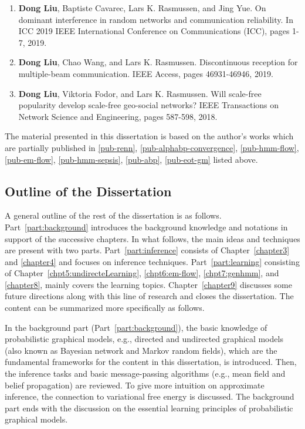 \begin{enumerate}
\item \textbf{Dong Liu}, Baptiste Cavarec, Lars K. Rasmussen, and Jing Yue. On dominant interference in random networks and communication reliability. In ICC 2019 IEEE International Conference on Communications (ICC), pages 1-7, 2019.
  
\item \textbf{Dong Liu}, Chao Wang, and Lars K. Rasmussen. Discontinuous reception for multiple-beam communication. IEEE Access, pages 46931-46946, 2019.
  
\item \textbf{Dong Liu}, Viktoria Fodor, and Lars K. Rasmussen. Will scale-free popularity develop scale-free geo-social networks? IEEE Transactions on Network Science and Engineering, pages 587-598, 2018.
\end{enumerate}


The material presented in this dissertation is based on the author's works which are partially published in \ref{pub-renn}, \ref{pub-alphabp-convergence}, \ref{pub-hmm-flow}, \ref{pub-em-flow}, \ref{pub-hmm-sepsis}, \ref{pub-abp}, \ref{pub-eot-gm} listed above.
\subsection{Outline of the Dissertation}

A general outline of the rest of the dissertation is as follows. Part~\ref{part:background} introduces the background knowledge and notations in support of the successive chapters. In what follows, the main ideas and techniques are present with two parts. Part~\ref{part:inference} consists of Chapter~\ref{chapter3} and \ref{chapter4} and focuses on inference techniques. Part~\ref{part:learning} consisting of Chapter~\ref{chpt5:undirecteLearning}, \ref{chpt6:em-flow}, \ref{chpt7:genhmm}, and \ref{chapter8}, mainly covers the learning topics. Chapter~\ref{chapter9} discusses some future directions along with this line of research and closes the dissertation. The content can be summarized more specifically as follows.

In the background part (Part~\ref{part:background}), the basic knowledge of probabilistic graphical models, e.g., directed and undirected graphical models (also known as Bayesian network and Markov random fields), which are the fundamental frameworks for the content in this dissertation, is introduced. Then, the inference tasks and basic message-passing algorithms (e.g., mean field and belief propagation) are reviewed. To give more intuition on approximate inference, the connection to variational free energy is discussed. The background part ends with the discussion on the essential learning principles of probabilistic graphical models.

